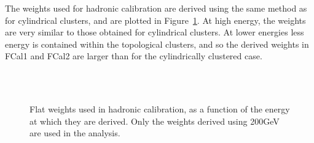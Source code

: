 The weights used for hadronic calibration are derived using the same method as for cylindrical clusters, and are plotted in Figure~\ref{TBplot_t420_weights}. At high energy, the weights are very similar to those obtained for cylindrical clusters. At lower energies less energy is contained within the topological clusters, and so the derived weights in FCal1 and FCal2 are larger than for the cylindrically clustered case. 


\begin{figure}
\begin{center}
\\
\\
\caption{Flat weights used in hadronic calibration, as a function of the energy at which they are derived. Only the weights derived using 200GeV are used in the analysis.  }
\label{TBplot_t420_weights}
\end{center}
\end{figure}




